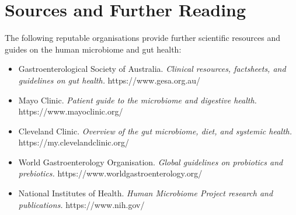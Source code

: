 \section*{Sources and Further Reading}
The following reputable organisations provide further scientific resources and guides on the human microbiome and gut health:
\begin{itemize}
    \item Gastroenterological Society of Australia. \textit{Clinical resources, factsheets, and guidelines on gut health.} https://www.gesa.org.au/
    \item Mayo Clinic. \textit{Patient guide to the microbiome and digestive health.} https://www.mayoclinic.org/
    \item Cleveland Clinic. \textit{Overview of the gut microbiome, diet, and systemic health.} https://my.clevelandclinic.org/
    \item World Gastroenterology Organisation. \textit{Global guidelines on probiotics and prebiotics.} https://www.worldgastroenterology.org/
    \item National Institutes of Health. \textit{Human Microbiome Project research and publications.} https://www.nih.gov/
\end{itemize}

